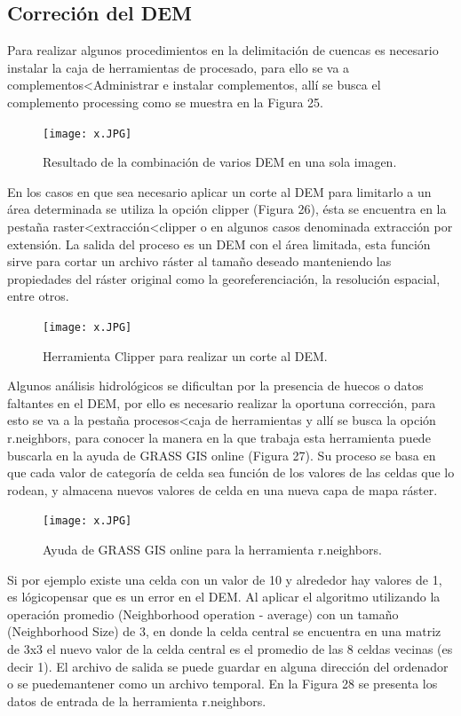 \documentclass[12pt,hidelinks]{article}
\begin{document}
\subsection{Correción del DEM}
Para realizar algunos procedimientos en la delimitación de cuencas es necesario instalar la caja de herramientas de procesado, para ello se va a complementos<Administrar e instalar complementos, allí se busca el complemento processing como se muestra en la Figura 25.
\begin{figure}[H]
    \centering
    \texttt{[image: x.JPG]}
    \caption{Resultado de la combinación de varios DEM en una sola imagen.}
    \label{fig:my_label}
\end{figure}
En los casos en que sea necesario aplicar un corte al DEM para limitarlo a un área determinada se utiliza la opción clipper (Figura 26), ésta se encuentra en la pestaña raster<extracción<clipper o en algunos casos denominada extracción por extensión. La salida del proceso es un DEM con el área limitada, esta función sirve para cortar un archivo ráster al tamaño deseado manteniendo las propiedades del ráster original como la georeferenciación, la resolución espacial, entre otros.
\begin{figure}[H]
    \centering
    \texttt{[image: x.JPG]}
    \caption{ Herramienta Clipper para realizar un corte al DEM.}
    \label{fig:my_label}
\end{figure}
Algunos análisis hidrológicos se dificultan por la presencia de huecos o datos faltantes en el DEM, por ello es necesario realizar la oportuna corrección, para esto se va a la pestaña procesos<caja de herramientas y allí se busca la opción r.neighbors, para conocer la manera en la que trabaja esta herramienta puede buscarla en la ayuda de GRASS GIS online (Figura 27). Su proceso se basa en que cada valor de categoría de celda sea función de los valores de las celdas que lo rodean, y almacena nuevos valores de celda en una nueva capa de mapa ráster.
\begin{figure}[H]
    \centering
    \texttt{[image: x.JPG]}
    \caption{Ayuda de GRASS GIS online para la herramienta r.neighbors.}
    \label{fig:my_label}
\end{figure}
Si por ejemplo existe una celda con un valor de 10 y alrededor hay valores de 1, es lógicopensar que es un error en el DEM. Al aplicar el algoritmo utilizando la operación promedio (Neighborhood operation - average) con un tamaño (Neighborhood Size) de 3, en donde la celda central se encuentra en una matriz de 3x3 el nuevo valor de la celda central es el promedio de las 8 celdas vecinas (es decir 1). El archivo de salida se puede guardar en alguna dirección del ordenador o se puedemantener como un archivo temporal. En la Figura 28 se presenta los datos de entrada de la herramienta r.neighbors.
\end{document}
